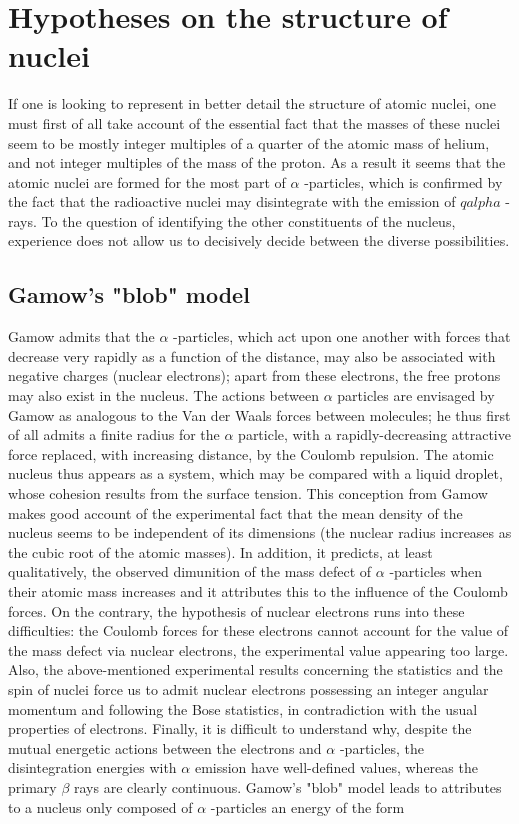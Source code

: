 \documentclass{article}
\begin{document}
\section{Hypotheses on the structure of nuclei}

If one is looking to represent in better detail the structure of atomic nuclei, one must first of all take account of the essential fact that the masses of these nuclei seem to be mostly integer multiples of a quarter of the atomic mass of helium, and not integer multiples of the mass of the proton. As a result it seems that the atomic nuclei are formed for the most part of $\alpha$ -particles, which is confirmed by the fact that the radioactive nuclei may disintegrate with the emission of $qalpha$ -rays. To the question of identifying the other constituents of the nucleus, experience does not allow us to decisively decide between the diverse possibilities.

\subsection{Gamow's "blob" model}

Gamow admits that the $\alpha$ -particles, which act upon one another with forces that decrease very rapidly as a function of the distance, may also be associated with negative charges (nuclear electrons); apart from these electrons, the free protons may also exist in the nucleus. The actions between $\alpha$ particles are envisaged by Gamow as analogous to the Van der Waals forces between molecules; he thus first of all admits a finite radius for the $\alpha$ particle, with a rapidly-decreasing attractive force replaced, with increasing distance, by the Coulomb repulsion. The atomic nucleus thus appears as a system, which may be compared with a liquid droplet, whose cohesion results from the surface tension. This conception from Gamow makes good account of the experimental fact that the mean density of the nucleus seems to be independent of its dimensions (the nuclear radius increases as the cubic root of the atomic masses). In addition, it predicts, at least qualitatively, the observed dimunition of the mass defect of $\alpha$ -particles when their atomic mass increases and it attributes this to the influence of the Coulomb forces. On the contrary, the hypothesis of nuclear electrons runs into these difficulties: the Coulomb forces for these electrons cannot account for the value of the mass defect via nuclear electrons, the experimental value appearing too large. Also, the above-mentioned experimental results concerning the statistics and the spin of nuclei force us to admit nuclear electrons possessing an integer angular momentum and following the Bose statistics, in contradiction with the usual properties of electrons. Finally, it is difficult to understand why, despite the mutual energetic actions between the electrons and $\alpha$ -particles, the disintegration energies with $\alpha$ emission have well-defined values, whereas the primary $\beta$ rays are clearly continuous.
Gamow's "blob" model leads to attributes to a nucleus only composed of $\alpha$ -particles an energy of the form
\end{document}
